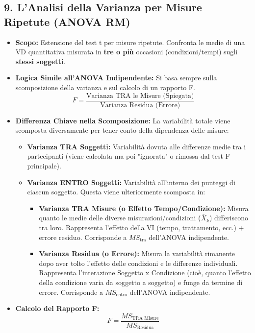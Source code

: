 \documentclass[12pt, a4paper]{article}
\newcommand{\Fscore}{F} %
\newcommand{\MSb}{MS_{\text{tra}}} %
\newcommand{\MSw}{MS_{\text{entro}}} %
\begin{document}
\subsection*{9. L'Analisi della Varianza per Misure Ripetute (ANOVA RM)}
\begin{itemize}
    \item \textbf{Scopo:} Estensione del test t per misure ripetute. Confronta le medie di una VD quantitativa misurata in \textbf{tre o più} occasioni (condizioni/tempi) sugli \textbf{stessi soggetti}.
    \item \textbf{Logica Simile all'ANOVA Indipendente:} Si basa sempre sulla scomposizione della varianza e sul calcolo di un rapporto F.
        $$ \Fscore = \frac{\text{Varianza TRA le Misure (Spiegata)}}{\text{Varianza Residua (Errore)}} $$
    \item \textbf{Differenza Chiave nella Scomposizione:} La variabilità totale viene scomposta diversamente per tener conto della dipendenza delle misure:
        \begin{itemize}
            \item \textbf{Varianza TRA Soggetti:} Variabilità dovuta alle differenze medie tra i partecipanti (viene calcolata ma poi "ignorata" o rimossa dal test F principale).
            \item \textbf{Varianza ENTRO Soggetti:} Variabilità all'interno dei punteggi di ciascun soggetto. Questa viene ulteriormente scomposta in:
                   \begin{itemize}
                       \item \textbf{Varianza TRA Misure (o Effetto Tempo/Condizione):} Misura quanto le medie delle diverse misurazioni/condizioni ($\bar{X}_k$) differiscono tra loro. Rappresenta l'effetto della VI (tempo, trattamento, ecc.) + errore residuo. Corrisponde a $\MSb$ dell'ANOVA indipendente.
                       \item \textbf{Varianza Residua (o Errore):} Misura la variabilità rimanente dopo aver tolto l'effetto delle condizioni e le differenze individuali. Rappresenta l'interazione Soggetto x Condizione (cioè, quanto l'effetto della condizione varia da soggetto a soggetto) e funge da termine di errore. Corrisponde a $\MSw$ dell'ANOVA indipendente.
                   \end{itemize}
        \end{itemize}
    \item \textbf{Calcolo del Rapporto F:}
        $$ F = \frac{MS_{\text{TRA Misure}}}{MS_{\text{Residua}}} $$

\end{itemize}
\end{document}

